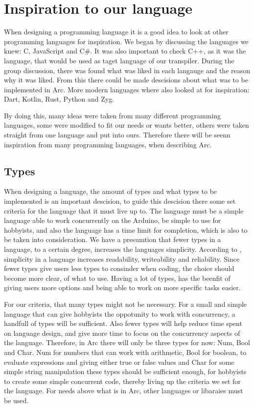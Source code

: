 \section{Inspiration to our language}\label{sec:inspiration}
When designing a programming language it is a good idea to look at other programming languages for inspiration. We began by discussing the languages we knew: C, JavaScript and C\#. It was also important to check C++, as it was the language, that would be used as taget language of our transpiler. During the group discussion, there was found what was liked in each langauge and the reason why it was liked. From this there could be made descisions about what was to be implemented in Arc. More modern languages where also looked at for inspiration: Dart, Kotlin, Rust, Python and Zyg. 

By doing this, many ideas were taken from many different programming languages, some were modified to fit our needs or wants better, others were taken straight from one language and put into ours. Therefore there will be seenn inspiration from many programming languages, when describing Arc.


\subsection{Types}\label{sec:types}
When designing a language, the amount of types and what types to be implemented is an important descision, to guide this descision there some set criteria for the language that it must live up to. The language must be a simple language able to work concurrently on the Arduino, be simple to use for hobbyists, and also the language has a time limit for completion, which is also to be taken into consideration. We have a presumtion that fewer types in a language, to a certain degree, increases the languages simplicity. According to , simplicity in a language increases readability, writeability and reliability. Since fewer types give users less types to consinder when coding, the choice should become more clear, of what to use. Having a lot of types, has the beenfit of giving users more options and being able to work on more specific tasks easier.

For our criteria, that many types might not be necessary. For a small and simple language that can give hobbyists the oppotunity to work with concurrency, a handfull of types will be sufficient. Also fewer types will help reduce time spent on language design, and give more time to focus on the concurrency aspects of the language. Therefore, in Arc there will only be three types for now: Num, Bool and Char. Num for numbers that can work with arithmetic, Bool for boolean, to evaluate expressions and giving either true or false values and Char for some simple string manipulation these types should be sufficient enough, for hobbyists to create some simple concurrent code, thereby living up the criteria we set for the language. For needs above what is in Arc, other languages or libaraies must be used. 

